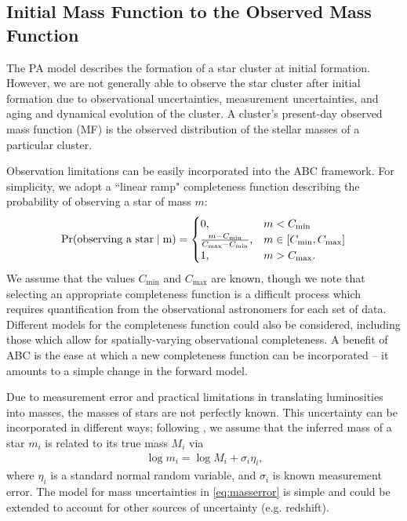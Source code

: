 \documentclass[12pt]{article}
\newcommand{\Proba}{\rm{Pr}}
\newcommand{\Cmin}{C_{\text{min}}}
\newcommand{\Cmax}{C_{\text{max}}}
\begin{document}
\subsection{Initial Mass Function to the Observed Mass Function} \label{sec:obs_challenges}
The PA model describes the formation of a star cluster at initial formation.  However, we are not generally able to observe the star cluster after initial formation due to observational uncertainties, measurement uncertainties, and aging and dynamical evolution of the cluster.  A cluster's present-day observed mass function (MF) is the observed distribution of the stellar masses of a particular cluster.

Observation limitations can be easily incorporated into the ABC framework.  For simplicity, we adopt a ``linear ramp" completeness function describing the probability of observing a star of mass $m$:
\begin{align}
	\Proba(\text{observing a star} \mid m) = \begin{cases} 0 \text{,} & m < \Cmin\\
								\frac{m - \Cmin}{\Cmax - \Cmin}\text{,} & m \in [\Cmin, \Cmax] \\
								1 \text{,} & m > \Cmax \text{.}
								\end{cases} \label{eq:ramp}
\end{align}
We assume that the values $\Cmin$ and $\Cmax$ are known, though we note that selecting an appropriate completeness function is a difficult process which requires quantification from the observational astronomers for each set of data.
Different models for the completeness function could also be considered, including those which allow for spatially-varying observational completeness.  A benefit of ABC is the ease at which a new completeness function can be incorporated -- it amounts to a simple change in the forward model.  

Due to measurement error and practical limitations in translating luminosities into masses, the masses of stars are not perfectly known. 
This uncertainty can be incorporated in different ways; following \cite{weisz13}, we assume that the inferred mass of a star $m_i$ is related to its true mass $M_i$ via 
\begin{align}
	\log m_i = \log M_i + \sigma_i \eta_i \text{,}
	\label{eq:masserror}
\end{align}
where $\eta_i$ is a standard normal random variable, and $\sigma_i$ is known measurement error.   %
The model for mass uncertainties in \eqref{eq:masserror} is simple and could be extended to account for other sources of uncertainty (e.g. redshift).
\end{document}
